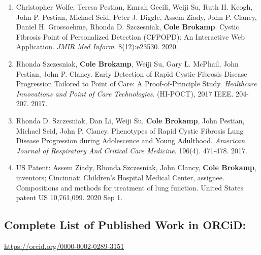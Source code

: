 \documentclass{nihbiosketch}
\begin{document}
\begin{enumerate}
\begin{enumerate}

  \item Christopher Wolfe, Teresa Pestian, Emrah Gecili, Weiji Su, Ruth H. Keogh, John P. Pestian, Michael Seid, Peter J. Diggle, Assem Ziady, John P. Clancy, Daniel H. Grossoehme, Rhonda D. Szczesniak, \textbf{Cole Brokamp}. Cystic Fibrosis Point of Personalized Detection (CFPOPD): An Interactive Web Application. \emph{JMIR Med Inform}. 8(12):e23530. 2020.

  \item Rhonda Szczesniak, \textbf{Cole Brokamp}, Weiji Su, Gary L. McPhail, John Pestian, John P. Clancy. Early Detection of Rapid Cystic Fibrosis Disease Progression Tailored to Point of Care: A Proof-of-Principle Study. \textit{Healthcare Innovations and Point of Care Technologies}. (HI-POCT), 2017 IEEE. 204-207. 2017.

  \item Rhonda D. Szczesniak, Dan Li, Weiji Su, \textbf{Cole Brokamp}, John Pestian, Michael Seid, John P. Clancy. Phenotypes of Rapid Cystic Fibrosis Lung Disease Progression during Adolescence and Young Adulthood. \textit{American Journal of Respiratory And Critical Care Medicine}. 196(4). 471-478. 2017.

\item US Patent: Assem Ziady, Rhonda Szczesniak, John Clancy, \textbf{Cole Brokamp}, inventors; Cincinnati Children's Hospital Medical Center, assignee. Compositions and methods for treatment of lung function. United States patent US 10,761,099. 2020 Sep 1.

\end{enumerate}

\end{enumerate}

\subsection*{Complete List of Published Work in ORCiD:} 
\url{https://orcid.org/0000-0002-0289-3151}
\end{document}
